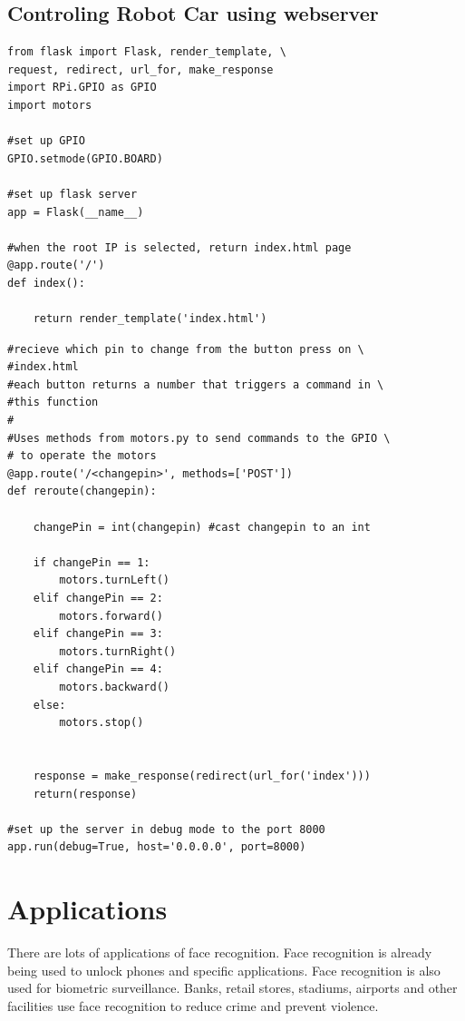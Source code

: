 \documentclass[sigconf]{acmart}
\begin{document}
\subsection{Controling Robot Car using webserver}
\begin{verbatim}
from flask import Flask, render_template, \ 
request, redirect, url_for, make_response
import RPi.GPIO as GPIO
import motors

#set up GPIO
GPIO.setmode(GPIO.BOARD) 

#set up flask server
app = Flask(__name__) 

#when the root IP is selected, return index.html page
@app.route('/')
def index():

	return render_template('index.html')
\end{verbatim}

\begin{verbatim}
#recieve which pin to change from the button press on \ 
#index.html
#each button returns a number that triggers a command in \ 
#this function
#
#Uses methods from motors.py to send commands to the GPIO \ 
# to operate the motors
@app.route('/<changepin>', methods=['POST'])
def reroute(changepin):

	changePin = int(changepin) #cast changepin to an int

	if changePin == 1:
		motors.turnLeft()
	elif changePin == 2:
		motors.forward()
	elif changePin == 3:
		motors.turnRight()
	elif changePin == 4:
		motors.backward()
	else:
		motors.stop()


	response = make_response(redirect(url_for('index')))
	return(response)

#set up the server in debug mode to the port 8000
app.run(debug=True, host='0.0.0.0', port=8000) 
\end{verbatim}

\section{Applications}
There are lots of applications of face recognition. Face recognition is already being 
used to unlock phones and specific applications. Face recognition is also used for 
biometric surveillance. Banks, retail stores, stadiums, airports and other facilities 
use face recognition to reduce crime and prevent violence.
\end{document}
